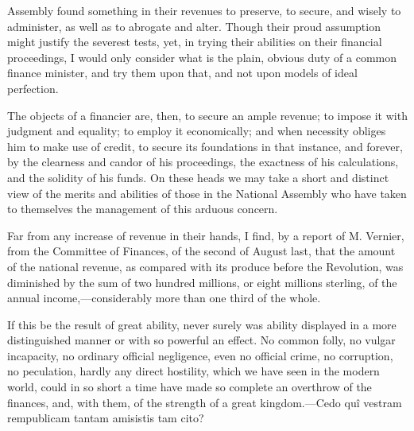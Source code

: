 Assembly found something in their revenues to preserve, to secure, and wisely to administer, as well as to abrogate and alter. Though their proud assumption might justify the severest tests, yet, in trying their abilities on their financial proceedings, I would only consider what is the plain, obvious duty of a common finance minister, and try them upon that, and not upon models of ideal perfection.

The objects of a financier are, then, to secure an ample revenue; to impose it with judgment and equality; to employ it economically; and when necessity obliges him to make use of credit, to secure its foundations in that instance, and forever, by the clearness and candor of his proceedings, the exactness of his calculations, and the solidity of his funds. On these heads we may take a short and distinct view of the merits and abilities of those in the National Assembly who have taken to themselves the management of this arduous concern.

Far from any increase of revenue in their hands, I find, by a report of M. Vernier, from the Committee of Finances, of the second of August last, that the amount of the national revenue, as compared with its produce before the Revolution, was diminished by the sum of two hundred millions, or eight millions sterling, of the annual income,—considerably more than one third of the whole.

If this be the result of great ability, never surely was ability displayed in a more distinguished manner or with so powerful an effect. No common folly, no vulgar incapacity, no ordinary official negligence, even no official crime, no corruption, no peculation, hardly any direct hostility, which we have seen in the modern world, could in so short a time have made so complete an overthrow of the finances, and, with them, of the strength of a great kingdom.—Cedo quî vestram rempublicam tantam amisistis tam cito?

